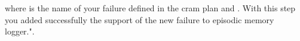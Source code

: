 where  is the name of your failure defined in the cram plan and .
With this step you added successfully the support of the new failure to \cram \neem episodic memory logger.".	


%
%
%
%
%



